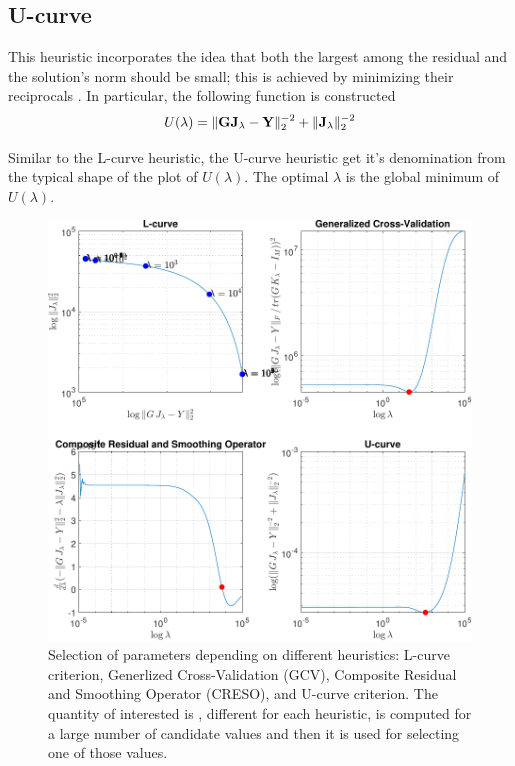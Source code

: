 \subsection{U-curve}

This heuristic incorporates the idea that both the largest among the residual and the solution's norm should be small; this is achieved by minimizing their reciprocals \cite{Ucurve}.
%
In particular, the following function is constructed
\begin{equation}
U(\lambda) = 
\lVert \mathbf{G}\mathbf{J}_\lambda - \mathbf{Y} \rVert_2^{-2} + \lVert \mathbf{J}_\lambda \rVert_2^{-2}
\end{equation}

Similar to the L-curve heuristic, the U-curve heuristic get it's denomination from the typical shape of the plot of $U(\lambda)$.
%
The optimal $\lambda$ is the global minimum of $U(\lambda)$.

\begin{figure}
\centering
\includegraphics[width=1\linewidth]{./img/ParameterFiting}
\caption{Selection of parameters depending on different heuristics: L-curve criterion, Generlized Cross-Validation (GCV), Composite Residual and Smoothing Operator (CRESO), and U-curve criterion. The quantity of interested is , different for each heuristic, is computed for a large number of candidate values and then it is used for selecting one of those values.}
\end{figure}

